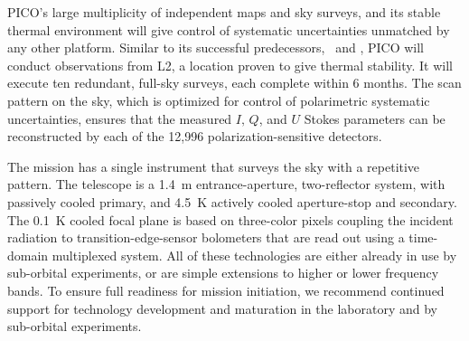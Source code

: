 \documentclass[PICOAPC.tex]{subfiles}
\begin{document}
\afterpage{%
  \switchToLayoutPageB{}
    
   \clearpage
\switchToLayoutPageA{}
}


PICO's large multiplicity of independent maps and sky surveys, and its stable thermal environment will give control of systematic uncertainties unmatched by any other platform. Similar to its successful predecessors, \wmap\ and \planck , PICO will conduct observations from L2, a location proven to give thermal stability.  It will execute ten redundant,  full-sky surveys, each complete within 6 months. The scan pattern on the sky, which is optimized for control of polarimetric systematic uncertainties, ensures that the measured $I,\, Q$, and $U$ Stokes parameters can be reconstructed by each of the 12,996 polarization-sensitive detectors. 


The mission has a single instrument that surveys the sky with a repetitive pattern.  The telescope is a 1.4~m entrance-aperture, two-reflector system, with passively cooled primary, and 4.5~K actively cooled aperture-stop and secondary. The 0.1~K cooled focal plane is based on three-color pixels coupling the incident radiation to transition-edge-sensor bolometers that are read out using a time-domain multiplexed system. All of these technologies are either already in use by sub-orbital experiments, or are simple extensions to higher or lower frequency bands. To ensure full readiness for mission initiation, we recommend continued support for technology development and maturation in the laboratory and by sub-orbital experiments. 
\end{document}
